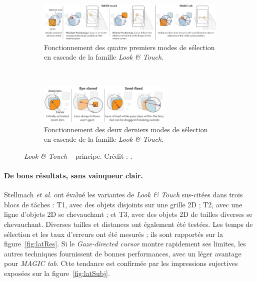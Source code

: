 	\begin{figure}[!htbp]
		\centering
		\begin{subfigure}[t]{\textwidth}
			\centering
			\includegraphics[width=\textwidth]{figures/ch2/lookandtouch}
			\caption[\emph{Look \&{} Touch -- principe}]{Fonctionnement des quatre premiers modes de sélection en cascade de la famille \emph{Look \&{} Touch}.}
			\label{fig:lookandtouch}
		\end{subfigure}
		~
		\begin{subfigure}[t]{\textwidth}
			\centering
			\includegraphics[width=0.7\textwidth]{figures/ch2/lookandtouch2}
			\caption[\emph{Look \&{} Touch -- principe II}]{Fonctionnement des deux derniers modes de sélection en cascade de la famille \emph{Look \&{} Touch}.}
			\label{fig:lookandtouch2}
		\end{subfigure}
		\caption[\emph{Look \&{} Touch} -- principe]{\emph{Look \&{} Touch} -- principe. Crédit : \cite{stellmach2012look}.}
		\label{lookAndTouchPrinciple}
	\end{figure}
	
	\paragraph{De bons résultats, sans vainqueur clair.}
	Stellmach \emph{et al.} ont évalué les variantes de \emph{Look \&{} Touch} sus-citées dans trois blocs de tâches : T1, avec des objets disjoints sur une grille 2D ; T2, avec une ligne d'objets 2D se chevauchant ; et T3, avec des objets 2D de tailles diverses se chevauchant. Diverses tailles et distances ont également été testées. Les temps de sélection et les taux d'erreurs ont été mesurés ; ils sont rapportés sur la figure~\ref{fig:latRes}. Si le \emph{Gaze-directed cursor} montre rapidement ses limites, les autres techniques fournissent de bonnes performances, avec un léger avantage pour \emph{MAGIC tab}. Ctte tendance est confirmée par les impressions sujectives exposées sur la figure~\ref{fig:latSubj}.
	

